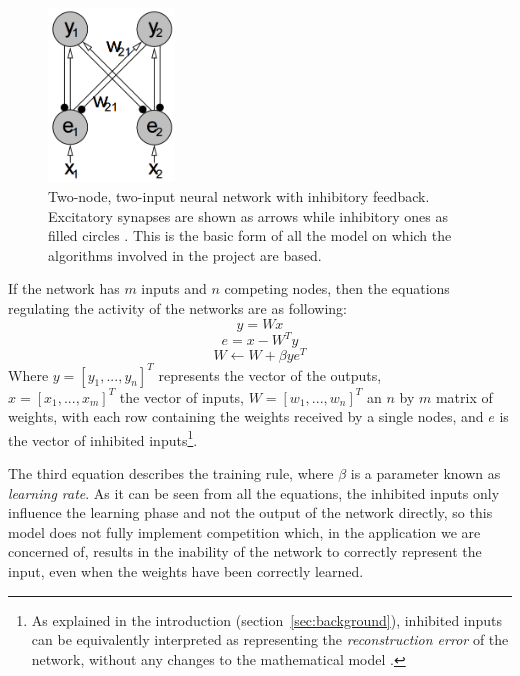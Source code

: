 \documentclass[11pt,a4paper]{report}
\begin{document}
				\newpage

				\begin{figure}[h]
					\centering
					\includegraphics[width=0.3\textwidth]{basictopology}
					\caption{Two-node, two-input neural network with inhibitory feedback. Excitatory synapses are shown as arrows while inhibitory ones as filled circles \cite{spratling2009unsupervised}. This is the basic form of all the model on which the algorithms involved in the project are based.}
					\label{fig:basictopology}
				\end{figure}

				If the network has $m$ inputs and $n$ competing nodes, then the equations regulating the activity of the networks are as following:
				\begin{equation}
					y = Wx
				\end{equation}
				\begin{equation}
					e = x - W^Ty
				\end{equation}
				\begin{equation}
					W \leftarrow W + \beta y e^T
				\end{equation}
				Where $y = [y_1, ..., y_n]^T$ represents the vector of the outputs,\\$x = [x_1, ..., x_m]^T$ the vector of inputs, $W = [w_1, ..., w_n]^T$ an $n$ by $m$ matrix of weights, with each row containing the weights received by a single nodes, and $e$ is the vector of inhibited inputs\footnote{As explained in the introduction (section~\ref{sec:background}), inhibited inputs can be equivalently interpreted as representing the \emph{reconstruction error} of the network, without any changes to the mathematical model \cite{spratling2009unsupervised}.}.
			
				The third equation describes the training rule, where $\beta$ is a parameter known as \emph{learning rate}. As it can be seen from all the equations, the inhibited inputs only influence the learning phase and not the output of the network directly, so this model does not fully implement competition which, in the application we are concerned of, results in the inability of the network to correctly represent the input, even when the weights have been correctly learned.
				
\end{document}
